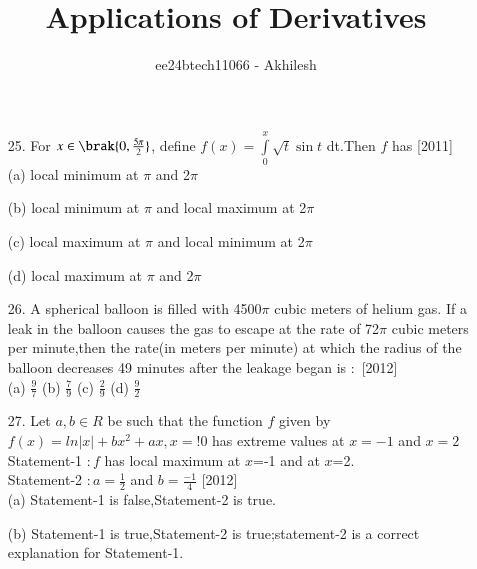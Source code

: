 \documentclass[journal,12pt,twocolumn]{IEEEtran}
\theoremstyle{remark}
\begin{document}

\vspace{3cm}

\title{Applications of Derivatives}
\author{ee24btech11066 - Akhilesh}
\maketitle
\newpage
\bigskip

\renewcommand{\thefigure}{\theenumi}
\renewcommand{\thetable}{\theenumi}
\begin{enumerate}
\item[25.] For $x \in \brak{0,\frac{5\pi}{2}}$, define $f(x)=\int\limits_0^x\sqrt{t}\sin t$ dt.Then $f$ has \hfill{[2011]}\\

   {(a)}  local minimum at $\pi$ and 2$\pi$
   
   {(b)}  local minimum at $\pi$ and local maximum at 2$\pi$

   {(c)}  local maximum at $\pi$ and local minimum at 2$\pi$

   {(d)}  local maximum at $\pi$ and 2$\pi$\\
    
\item[26.] A spherical balloon is filled with 4500$\pi$ cubic meters of helium gas. If a leak in the balloon causes the gas to escape at the rate of 72$\pi$ cubic meters per minute,then the rate{(in meters per minute)} at which the radius of the balloon decreases 49 minutes after the leakage began is $:$ \hfill{[2012]}\\
{(a)} $\frac{9}{7}$ \hspace{0.5cm} {(b)}  $\frac{7}{9}$ \hspace{0.5cm} {(c)}  $\frac{2}{9}$\hspace{0.5cm} {(d)} $\frac{9}{2}$ \\  

\item[27.] Let $a,b\in R$ be such that the function $f$ given by $f(x)=ln|x|+bx^{2}+ax,x=$!$0$ has extreme values at $x=-1$ and $x=2$\\
Statement-1 $: f$ has local maximum at $x$=-1 and at $x$=2.\\
Statement-2 $: a=\frac{1}{2}$ and $b=\frac{-1}{4}$ \hfill{[2012]}\\
{(a)} Statement-1 is false,Statement-2 is true.

{(b)} Statement-1 is true,Statement-2 is true;statement-2 is a correct explanation for Statement-1.


\end{enumerate}
\end{document}
